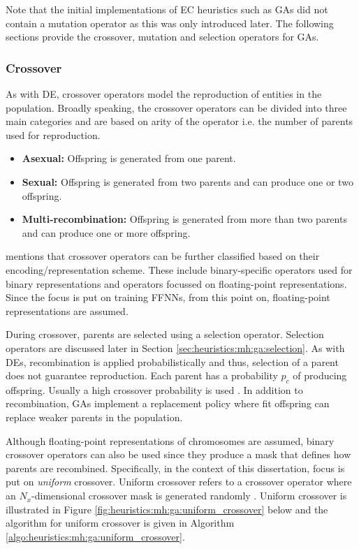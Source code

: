 Note that the initial implementations of \ac{EC} heuristics such as \acp{GA} did not contain a mutation operator as this was only introduced later. The following sections provide the crossover, mutation and selection operators for \acp{GA}.

\subsubsection{Crossover}
\label{sec:heuristics:mh:ga:crossover}

As with \ac{DE}, crossover operators model the reproduction of entities in the population. Broadly speaking, the crossover operators can be divided into three main categories \cite{ref:engelbrecht:2007} and are based on arity of the operator i.e. the number of parents used for reproduction.

\begin{itemize}
    \item \textbf{Asexual: } Offspring is generated from one parent.
    
    \item \textbf{Sexual: } Offspring is generated from two parents and can produce one or two offspring.
    
    \item \textbf{Multi-recombination: } Offspring is generated from more than two parents and can produce one or more offspring.
\end{itemize}

\citeauthor{ref:engelbrecht:2007}\cite{ref:engelbrecht:2007} mentions that crossover operators can be further classified based on their encoding/representation scheme. These include binary-specific operators used for binary representations and operators focussed on floating-point representations. Since the focus is put on training \acp{FFNN}, from this point on, floating-point representations are assumed.

During crossover, parents are selected using a selection operator. Selection operators are discussed later in Section \ref{sec:heuristics:mh:ga:selection}. As with \acp{DE}, recombination is applied probabilistically and thus, selection of a parent does not guarantee reproduction. Each parent has a probability $p_{c}$ of producing offspring. Usually a high crossover probability is used \cite{ref:engelbrecht:2007}. In addition to recombination, \acp{GA} implement a replacement policy where fit offspring can replace weaker parents in the population.

Although floating-point representations of chromosomes are assumed, binary crossover operators can also be used since they produce a mask that defines how parents are recombined. Specifically, in the context of this dissertation, focus is put on \textit{uniform} crossover. Uniform crossover refers to a crossover operator where an $N_{x}$-dimensional crossover mask is generated randomly \cite{ref:syswerda:1989}. Uniform crossover is illustrated in Figure \ref{fig:heuristics:mh:ga:uniform_crossover} below and the algorithm for uniform crossover is given in Algorithm \ref{algo:heuristics:mh:ga:uniform_crossover}.



